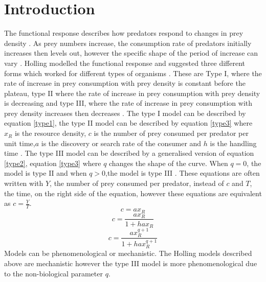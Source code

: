 \documentclass{article}
\begin{document}
\section{Introduction}
The functional response describes how predators respond to changes in prey density \parencite{hollingsawfly1959}\parencite{Solomon1949}. As prey numbers increase, the consumption rate of predators initially increases then levels out, however the specific shape of the period of increase can vary \parencite{hollingsawfly1959}. Holling modelled the functional response and suggested three different forms which worked for different types of organisms \parencite{hollingsawfly1959}. These are Type I, where the rate of increase in prey consumption with prey density is constant before the plateau, type II where the rate of increase in prey consumption with prey density is decreasing and type III, where the  rate of increase in prey consumption with prey density increases then decreases \parencite{hollingsawfly1959}. The type I model can be described by equation \ref{type1}, the type II model can be described by equation \ref{type3} where $x_R$ is the resource density, $c$ is the number of prey consumed per predator per unit time,$a$ is the discovery or search rate of the consumer and $h$ is the handling time \parencite{Dawes2013}\parencite{Holling1959}. The type III model can be described by a generalised version of equation \ref{type2}, equation \ref{type3} where $q$ changes the shape of the curve\parencite{Dawes2013}. %
When $q=0$, the model is type II and when $q>0$,the model is type III \parencite{Dawes2013}. These equations are often written with $Y$, the number of prey consumed per predator, instead of $c$ and $T$, the time, on the right side of the equation, however these equations are equivalent as $c=\frac{Y}{T}$.%
\begin{equation}\label{type1}
    c=ax_R
\end{equation}
\begin{equation}\label{type2}
c=\frac{ax_R}{1+hax_R}
\end{equation}
\begin{equation}\label{type3}
c=\frac{ax_R^{q+1}}{1+hax_R^{q+1}}
\end{equation}
Models can be phenomenological or mechanistic. %
The Holling models described above are mechanistic however the type III model is more phenomenological due to the non-biological parameter $q$.
\end{document}
